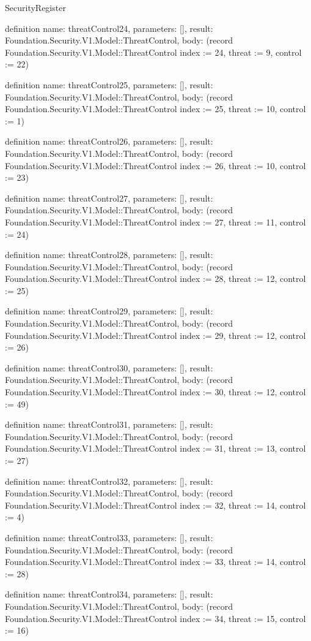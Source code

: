 \begin{lexlean}{SecurityRegister}
\begin{semanticmodule}
definition{
  name: threatControl24,
  parameters: [],
  result: Foundation.Security.V1.Model::ThreatControl,
  body: (record Foundation.Security.V1.Model::ThreatControl {index := 24, threat := 9, control := 22})
}

definition{
  name: threatControl25,
  parameters: [],
  result: Foundation.Security.V1.Model::ThreatControl,
  body: (record Foundation.Security.V1.Model::ThreatControl {index := 25, threat := 10, control := 1})
}

definition{
  name: threatControl26,
  parameters: [],
  result: Foundation.Security.V1.Model::ThreatControl,
  body: (record Foundation.Security.V1.Model::ThreatControl {index := 26, threat := 10, control := 23})
}

definition{
  name: threatControl27,
  parameters: [],
  result: Foundation.Security.V1.Model::ThreatControl,
  body: (record Foundation.Security.V1.Model::ThreatControl {index := 27, threat := 11, control := 24})
}

definition{
  name: threatControl28,
  parameters: [],
  result: Foundation.Security.V1.Model::ThreatControl,
  body: (record Foundation.Security.V1.Model::ThreatControl {index := 28, threat := 12, control := 25})
}

definition{
  name: threatControl29,
  parameters: [],
  result: Foundation.Security.V1.Model::ThreatControl,
  body: (record Foundation.Security.V1.Model::ThreatControl {index := 29, threat := 12, control := 26})
}

definition{
  name: threatControl30,
  parameters: [],
  result: Foundation.Security.V1.Model::ThreatControl,
  body: (record Foundation.Security.V1.Model::ThreatControl {index := 30, threat := 12, control := 49})
}

definition{
  name: threatControl31,
  parameters: [],
  result: Foundation.Security.V1.Model::ThreatControl,
  body: (record Foundation.Security.V1.Model::ThreatControl {index := 31, threat := 13, control := 27})
}

definition{
  name: threatControl32,
  parameters: [],
  result: Foundation.Security.V1.Model::ThreatControl,
  body: (record Foundation.Security.V1.Model::ThreatControl {index := 32, threat := 14, control := 4})
}

definition{
  name: threatControl33,
  parameters: [],
  result: Foundation.Security.V1.Model::ThreatControl,
  body: (record Foundation.Security.V1.Model::ThreatControl {index := 33, threat := 14, control := 28})
}

definition{
  name: threatControl34,
  parameters: [],
  result: Foundation.Security.V1.Model::ThreatControl,
  body: (record Foundation.Security.V1.Model::ThreatControl {index := 34, threat := 15, control := 16})
}


\end{semanticmodule}
\end{lexlean}

